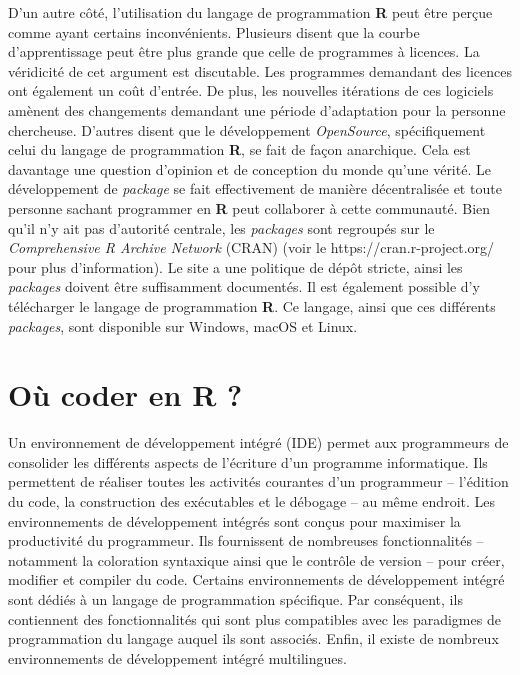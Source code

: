 \documentclass[
  letterpaper,
  DIV=11,
  numbers=noendperiod]{scrreprt}
\begin{document}
D'un autre côté, l'utilisation du langage de programmation \textbf{R}
peut être perçue comme ayant certains inconvénients. Plusieurs disent
que la courbe d'apprentissage peut être plus grande que celle de
programmes à licences. La véridicité de cet argument est discutable. Les
programmes demandant des licences ont également un coût d'entrée. De
plus, les nouvelles itérations de ces logiciels amènent des changements
demandant une période d'adaptation pour la personne chercheuse. D'autres
disent que le développement \emph{OpenSource}, spécifiquement celui du
langage de programmation \textbf{R}, se fait de façon anarchique. Cela
est davantage une question d'opinion et de conception du monde qu'une
vérité. Le développement de \emph{package} se fait effectivement de
manière décentralisée et toute personne sachant programmer en \textbf{R}
peut collaborer à cette communauté. Bien qu'il n'y ait pas d'autorité
centrale, les \emph{packages} sont regroupés sur le \emph{Comprehensive
R Archive Network} (CRAN) (voir le https://cran.r-project.org/ pour plus
d'information). Le site a une politique de dépôt stricte, ainsi les
\emph{packages} doivent être suffisamment documentés. Il est également
possible d'y télécharger le langage de programmation \textbf{R}. Ce
langage, ainsi que ces différents \emph{packages}, sont disponible sur
Windows, macOS et Linux.

\section{Où coder en R ?}\label{ouxf9-coder-en-r}

Un environnement de développement intégré (IDE) permet aux programmeurs
de consolider les différents aspects de l'écriture d'un programme
informatique. Ils permettent de réaliser toutes les activités courantes
d'un programmeur -- l'édition du code, la construction des exécutables
et le débogage -- au même endroit. Les environnements de développement
intégrés sont conçus pour maximiser la productivité du programmeur. Ils
fournissent de nombreuses fonctionnalités -- notamment la coloration
syntaxique ainsi que le contrôle de version -- pour créer, modifier et
compiler du code. Certains environnements de développement intégré sont
dédiés à un langage de programmation spécifique. Par conséquent, ils
contiennent des fonctionnalités qui sont plus compatibles avec les
paradigmes de programmation du langage auquel ils sont associés. Enfin,
il existe de nombreux environnements de développement intégré
multilingues.
\end{document}
